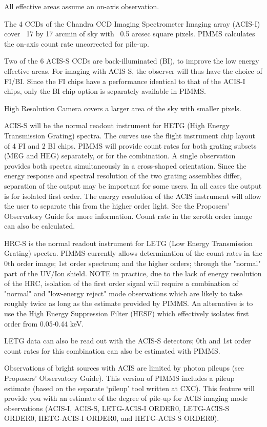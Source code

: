 All effective areas assume an on-axis observation.

The 4 CCDs of the Chandra CCD Imaging Spectrometer Imaging array (ACIS-I)
cover ~17 by 17 arcmin of sky with ~0.5 arcsec square pixels.  PIMMS
calculates the on-axis count rate uncorrected for pile-up.

Two of the 6 ACIS-S CCDs are back-illuminated (BI), to improve the low
energy effective areas. For imaging with ACIS-S, the observer will thus
have the choice of FI/BI.  Since the FI chips have a performance identical
to that of the ACIS-I chips, only the BI chip option is separately available
in PIMMS.

High Resolution Camera covers a larger area of the sky with smaller pixels.

ACIS-S will be the normal readout instrument for HETG
(High Energy Transmission Grating) spectra. The curves
use the flight instrument chip layout of 4 FI and 2 BI chips. PIMMS will
provide count rates for both grating subsets (MEG and HEG) separately, or
for the combination. A single observation provides both spectra
simultaneously in a cross-shaped orientation. Since the energy response and
spectral resolution of the two grating assemblies differ, separation of the
output may be important for some users. In all cases the output is for
isolated first order. The energy resolution of the ACIS instrument will
allow the user to separate this from the higher order light. See the Proposers'
Observatory Guide for more information.  Count rate in the zeroth order
image can also be calculated.

HRC-S is the normal readout instrument for LETG (Low Energy
Transmission Grating) spectra. PIMMS currently
allows determination of the count rates in the 0th order image; 1st order
spectrum; and the higher orders; through the "normal" part of the UV/Ion
shield.  NOTE in practice, due to the lack of energy resolution of the HRC,
isolation of the first order signal will require a combination of "normal"
and "low-energy reject" mode observations which are likely to take roughly
twice as long as the estimate provided by PIMMS. An alternative is to use
the High Energy Suppression Filter (HESF) which effectively isolates first
order from 0.05-0.44 keV.

LETG data can also be read out with the ACIS-S detectors; 0th and 1st order
count rates for this combination can also be estimated with PIMMS.

Observations of bright sources with ACIS are limited by photon pileups
(see Proposers' Observatory Guide).  This version of PIMMS includes a
pileup estimate (based on the separate `pileup' tool written at CXC).
This feature will provide you with an estimate of the degree of pile-up
for ACIS imaging mode observations (ACIS-I, ACIS-S, LETG-ACIS-I ORDER0,
LETG-ACIS-S ORDER0, HETG-ACIS-I ORDER0, and HETG-ACIS-S ORDER0).

